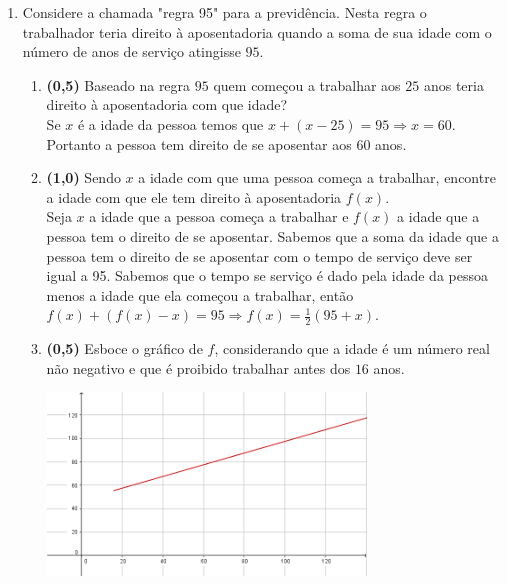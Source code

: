 \documentclass[a4paper,12pt]{article}
\begin{document}
\begin{enumerate}
\vspace{5mm}
\item Considere a chamada "regra 95" para a previdência.  Nesta regra o trabalhador teria direito à aposentadoria quando a soma de sua idade com o número de anos de serviço atingisse $95$. 

\begin{enumerate}
\item {\bf (0,5)} Baseado na regra $95$ quem começou a trabalhar aos $25$ anos teria direito à aposentadoria com que idade?\\
\vspace{3mm}
Se $x$ é a idade da pessoa temos que $x+(x-25)=95\Rightarrow x=60$. Portanto a pessoa tem direito de se aposentar aos $60$ anos.
\item {\bf (1,0)} Sendo $x$ a idade com que uma pessoa começa a trabalhar, encontre a idade com que ele tem direito à aposentadoria $f(x)$.\\
\vspace{3mm}
Seja $x$ a idade que a pessoa começa a trabalhar e $f(x)$ a idade que a pessoa tem o direito de se aposentar. Sabemos que a soma da idade que a pessoa tem o direito de se aposentar com o tempo de serviço deve ser igual a 95.
 Sabemos que o tempo se serviço é dado pela idade da pessoa menos a idade que ela começou a trabalhar, então $f(x)+(f(x)-x)=95\Rightarrow f(x)=\frac{1}{2}(95+x).$
\item{\bf (0,5)}  Esboce o gráfico de $f$, considerando que a idade é um número real não negativo e que é proibido trabalhar antes dos $16$ anos.
\begin{center}
 \includegraphics[width = 320px]{Q5c.png}
\end{center}
\end{enumerate}
\end{enumerate}
\end{document}

